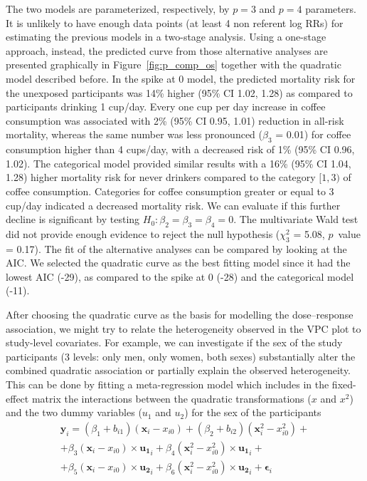\documentclass[11pt,a4paper,twoside,openany]{book}\usepackage{knitr}
\begin{document}
{{\noindent The two models are parameterized, respectively, by $p = 3$ and $p = 4$ parameters. It is unlikely to have enough data points (at least 4 non referent log RRs) for estimating the previous models in a two-stage analysis. Using a one-stage approach, instead, the predicted curve from those alternative analyses are presented graphically in Figure~\ref{fig:p_comp_os} together with the quadratic model described before. 
In the spike at 0 model, the predicted mortality risk for the unexposed participants was 14\% higher (95\% CI 1.02, 1.28) as compared to participants drinking 1 cup/day. Every one cup per day increase in coffee consumption was associated with 2\% (95\% CI 0.95, 1.01) reduction in all-risk mortality, whereas the same number was less pronounced ($\beta_3$ = 0.01) for coffee consumption higher than 4 cups/day, with a decreased risk of 1\% (95\% CI 0.96, 1.02). 
The categorical model provided similar results with a 16\% (95\% CI 1.04, 1.28) higher mortality risk for never drinkers compared to the category $[1, 3)$ of coffee consumption. Categories for coffee consumption greater or equal to 3 cup/day indicated a decreased mortality risk. We can evaluate if this further decline is significant by testing $H_0: \beta_2 = \beta_3 = \beta_4 = 0$. The multivariate Wald test did not provide enough evidence to reject the null hypothesis ($\chi_3^2$ = 5.08, $p$~value = 0.17).
The fit of the alternative analyses can be compared by looking at the AIC. We selected the quadratic curve as the best fitting model since it had the lowest AIC (-29), as compared to the spike at 0 (-28) and the categorical model (-11).



After choosing the quadratic curve as the basis for modelling the dose--response association, we might try to relate the heterogeneity observed in the VPC plot to study-level covariates. For example, we can investigate if the sex of the study participants (3 levels: only men, only women, both sexes) substantially alter the combined quadratic association or partially explain the observed heterogeneity. This can be done by fitting a meta-regression model which includes in the fixed-effect matrix the interactions between the quadratic transformations ($x$ and $x^2$) and the two dummy variables ($u_1$ and $u_2$) for the sex of the participants
\begin{multline*}
\mathbf{y}_i = (\beta_1 + b_{i1}) (\mathbf{x}_{i} - {x}_{i0}) + (\beta_2  + b_{i2}) (\mathbf{x}_{i}^2 - {x}_{i0}^2) +  \\
+ \beta_3 (\mathbf{x}_{i} - {x}_{i0}) \times \mathbf{u_1}_{i} + \beta_4 (\mathbf{x}_{i}^2 - {x}_{i0}^2)\times \mathbf{u_1}_{i}  + \\ 
 + \beta_5 (\mathbf{x}_{i} - {x}_{i0}) \times \mathbf{u_2}_{i} + \beta_6 (\mathbf{x}_{i}^2 - {x}_{i0}^2)\times \mathbf{u_2}_{i}  + 
\boldsymbol{\epsilon}_{i}
\end{multline*}

}}
\end{document}
